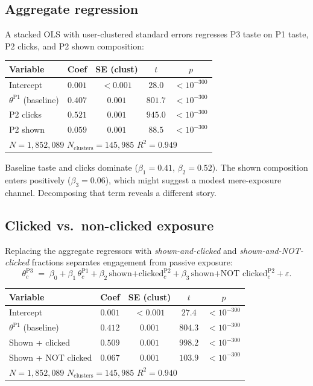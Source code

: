 \documentclass[11pt]{article}
\begin{document}
\subsection*{Aggregate regression}

A stacked OLS with user-clustered standard errors regresses P3 taste on P1 taste, P2 clicks, and P2 shown composition:

\begin{center}
\begin{tabular}{lcccc}
\toprule
Variable & Coef & SE (clust) & $t$ & $p$ \\
\midrule
Intercept & $0.001$ & $<0.001$ & $28.0$ & $<10^{-300}$ \\
$\theta^{\text{P1}}$ (baseline) & $0.407$ & $0.001$ & $801.7$ & $<10^{-300}$ \\
P2 clicks & $0.521$ & $0.001$ & $945.0$ & $<10^{-300}$ \\
P2 shown & $0.059$ & $0.001$ & $88.5$ & $<10^{-300}$ \\
\midrule
\multicolumn{5}{l}{$N = 1{,}852{,}089$ \quad $N_{\text{clusters}} = 145{,}985$ \quad $R^2 = 0.949$} \\
\bottomrule
\end{tabular}
\end{center}

Baseline taste and clicks dominate ($\beta_1 = 0.41$, $\beta_2 = 0.52$). The shown composition enters positively ($\beta_3 = 0.06$), which might suggest a modest mere-exposure channel. Decomposing that term reveals a different story.

\subsection*{Clicked vs.\ non-clicked exposure}

Replacing the aggregate regressors with \emph{shown-and-clicked} and \emph{shown-and-NOT-clicked} fractions separates engagement from passive exposure:
\[
\theta_{c}^{\text{P3}} \;=\; \beta_0 + \beta_1\,\theta_{c}^{\text{P1}} + \beta_2\,\text{shown{+}clicked}_{c}^{\text{P2}} + \beta_3\,\text{shown{+}NOT clicked}_{c}^{\text{P2}} + \varepsilon.
\]

\begin{center}
\begin{tabular}{lcccc}
\toprule
Variable & Coef & SE (clust) & $t$ & $p$ \\
\midrule
Intercept & $0.001$ & $<0.001$ & $27.4$ & $<10^{-300}$ \\
$\theta^{\text{P1}}$ (baseline) & $0.412$ & $0.001$ & $804.3$ & $<10^{-300}$ \\
Shown + clicked & $\mathbf{0.509}$ & $0.001$ & $998.2$ & $<10^{-300}$ \\
Shown + NOT clicked & $\mathbf{0.067}$ & $0.001$ & $103.9$ & $<10^{-300}$ \\
\midrule
\multicolumn{5}{l}{$N = 1{,}852{,}089$ \quad $N_{\text{clusters}} = 145{,}985$ \quad $R^2 = 0.940$} \\
\bottomrule
\end{tabular}
\end{center}
\end{document}
